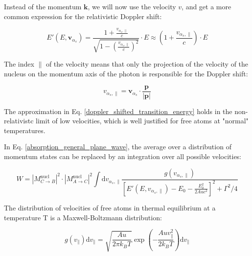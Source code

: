 \documentclass{article}
\begin{document}
Instead of the momentum $\mathbf{k}$, we will now use the velocity $v$, and get a more common expression for the relativistic Doppler shift:


\begin{equation}
	\label{doppler_shifted_transition_energy}
	E' (E, \mathbf{v}_{\alpha_s}) = \frac{1 + \frac{v_{\alpha_s, \parallel}}{c}}{\sqrt{1 - \left( \frac{v_{\alpha_s, \parallel}}{c} \right)^2}} \cdot E \approx \left( 1 + \frac{v_{\alpha_s, \parallel}}{c} \right) \cdot E
\end{equation}

The index $\parallel$ of the velocity means that only the projection of the velocity of the nucleus on the momentum axis of the photon is responsible for the Doppler shift:

\begin{equation}
	\label{v_parallel}
	v_{\alpha_s, \parallel} = \mathbf{v}_{\alpha_s} \cdot \frac{\mathbf{p}}{\left| \mathbf{p} \right|}
\end{equation}

The approximation in Eq. \ref{doppler_shifted_transition_energy} holds in the non-relativistc limit of low velocities, which is well justified for free atoms at "normal" temperatures.

In Eq. \ref{absorption_general_plane_wave}, the average over a distribution of momentum states can be replaced by an integration over all possible velocities:

\begin{equation}
\label{absorption_plane_wave_v}
	W = \left| M^{\mathrm{nucl}}_{C \to B} \right|^2 \cdot \left| M^{\mathrm{nucl}}_{A \to C} \right|^2 \int \mathrm{d} v_{\alpha_s, \parallel}  \frac{g(v_{\alpha_s, \parallel})}{ \left[ E' (E, v_{\alpha_s, \parallel})- E_0 - \frac{E_0^2}{2 Auc^2} \right]^2 + \Gamma^2 / 4}
\end{equation}

The distribution of velocities of free atoms in thermal equilibrium at a temperature T is a Maxwell-Boltzmann distribution:

\begin{equation}
	\label{maxwell_boltzmann_distribution}
	g(v_\parallel) \mathrm{d} v_\parallel = \sqrt{\frac{A u}{2 \pi k_B T}} \exp{\left( - \frac{A u v_\parallel^2}{2 k_B T} \right)} \mathrm{d} v_\parallel
\end{equation}
\end{document}
